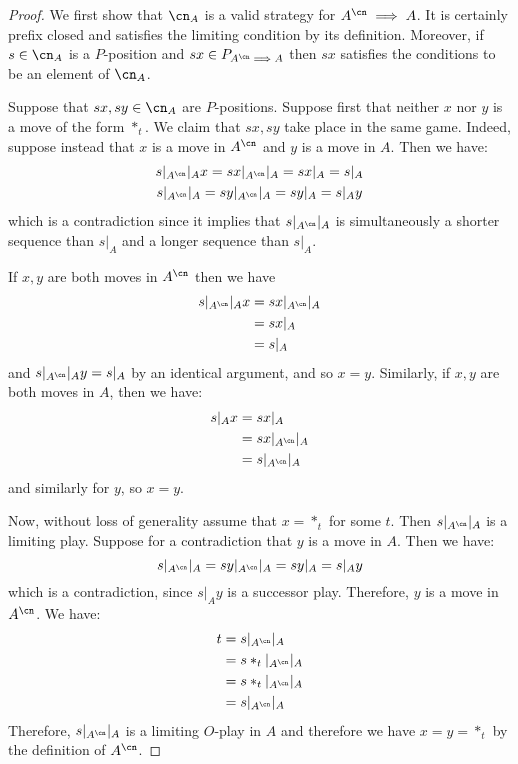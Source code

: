 \documentclass[11pt]{article} %
\begin{document}
\begin{proof}
  We first show that $\cn_A$ is a valid strategy for $A^{\cn}\implies A$.  It is certainly prefix closed and satisfies the limiting condition by its definition.  Moreover, if $s\in\cn_A$ is a $P$-position and $sx\in P_{A^{\cn}\implies A}$ then $sx$ satisfies the conditions to be an element of $\cn_A$.

  Suppose that $sx, sy\in \cn_A$ are $P$-positions.  Suppose first that neither $x$ nor $y$ is a move of the form $*_t$.  We claim that $sx,sy$ take place in the same game.  Indeed, suppose instead that $x$ is a move in $A^{\cn}$ and $y$ is a move in $A$.  Then we have:
  \begin{gather*}
    s\vert_{A^{\cn}}\vert_A x = sx\vert_{A^{\cn}}\vert_A = sx\vert_A = s\vert_A\\
    s\vert_{A^{\cn}}\vert_A = sy\vert_{A^{\cn}}\vert_A = sy\vert_A = s\vert_Ay
  \end{gather*}
  which is a contradiction since it implies that $s\vert_{A^{\cn}}\vert_A$ is simultaneously a shorter sequence than $s\vert_A$ and a longer sequence than $s\vert_A$.

  If $x,y$ are both moves in $A^{\cn}$ then we have
  \begin{align*}
    s\vert_{A^{\cn}}\vert_A x &= sx\vert_{A^{\cn}}\vert_A \\
    & = sx\vert_A\\
    & = s\vert_A
  \end{align*}
  and $s\vert_{A^{\cn}}\vert_Ay=s\vert_A$ by an identical argument, and so $x=y$.  Similarly, if $x,y$ are both moves in $A$, then we have:
  \begin{align*}
    s\vert_A x &= sx\vert_A \\
    &= sx\vert_{A^{\cn}}\vert_A\\
    &= s\vert_{A^{\cn}}\vert_A
  \end{align*}
  and similarly for $y$, so $x=y$.

  Now, without loss of generality assume that $x=*_t$ for some $t$.  Then $s\vert_{A^{\cn}}\vert_A$ is a limiting play.  Suppose for a contradiction that $y$ is a move in $A$.  Then we have:
  \[
    s\vert_{A^{\cn}}\vert_A = sy\vert_{A^{\cn}}\vert_A=sy\vert_A = s\vert_Ay
    \]
  which is a contradiction, since $s\vert_Ay$ is a successor play.  Therefore, $y$ is a move in $A^{\cn}$.  We have:
  \begin{align*}
    t &= s\vert_{A^{\cn}}\vert_A\\
    &= s*_t\vert_{A^{\cn}}\vert_A\\
    &= s*_t\vert_{A^{\cn}}\vert_A\\
    &= s\vert_{A^{\cn}}\vert_A
  \end{align*}
  Therefore, $s\vert_{A^{\cn}}\vert_A$ is a limiting $O$-play in $A$ and therefore we have $x=y=*_t$ by the definition of $A^{\cn}$.  


\end{proof}
\end{document}

